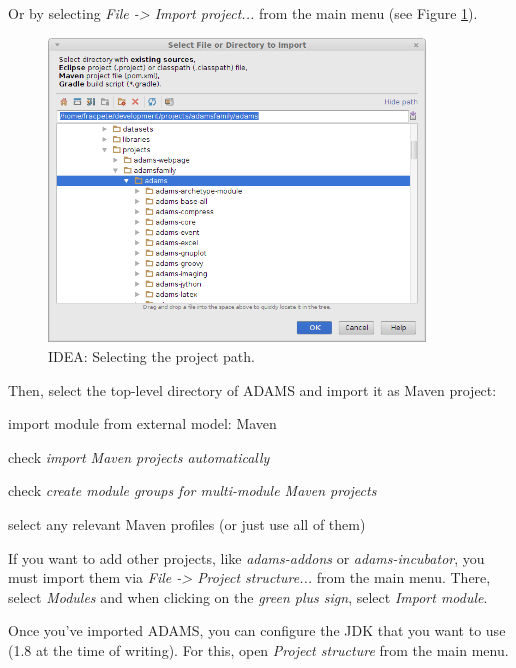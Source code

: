 Or by selecting \textit{File -> Import project...} from the main menu (see
Figure \ref{intellij-import_project-adams2}).
\begin{figure}[htb]
  \centering
  \includegraphics[width=10.0cm]{images/intellij-import_project-adams.png}
  \caption{IDEA: Selecting the project path.}
  \label{intellij-import_project-adams2}
\end{figure}
Then, select the top-level directory of ADAMS and import it as Maven project:
\begin{tight_itemize}
  \item import module from external model: Maven
  \item check \textit{import Maven projects automatically}
  \item check \textit{create module groups for multi-module Maven projects}
  \item select any relevant Maven profiles (or just use all of them)
\end{tight_itemize}
If you want to add other projects, like \textit{adams-addons} or
\textit{adams-incubator}, you must import them via
\textit{File -> Project structure...} from the main menu. There, select
\textit{Modules} and when clicking on the \textit{green plus sign}, select
\textit{Import module}.

Once you've imported ADAMS, you can configure the JDK that you want to use
(1.8 at the time of writing). For this, open \textit{Project structure} from
the main menu.

